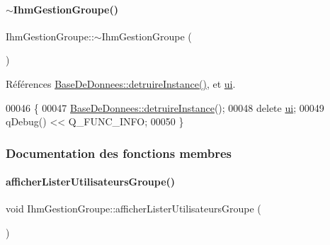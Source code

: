 \mbox{\label{class_ihm_gestion_groupe_aba32d8b8ea5b7d31232d41ae051ebcb7}} 
\paragraph{\texorpdfstring{$\sim$\+Ihm\+Gestion\+Groupe()}{~IhmGestionGroupe()}}
{\footnotesize\ttfamily Ihm\+Gestion\+Groupe\+::$\sim$\+Ihm\+Gestion\+Groupe (\begin{DoxyParamCaption}{ }\end{DoxyParamCaption})}



Références \hyperlink{class_base_de_donnees_a457401c0816b888c77ce915997545f4e}{Base\+De\+Donnees\+::detruire\+Instance()}, et \hyperlink{class_ihm_gestion_groupe_a9785ad3dadc1d2cad8558ca8b682dffd}{ui}.


\begin{DoxyCode}
00046 \{
00047     \hyperlink{class_base_de_donnees_a457401c0816b888c77ce915997545f4e}{BaseDeDonnees::detruireInstance}();
00048     \textcolor{keyword}{delete} \hyperlink{class_ihm_gestion_groupe_a9785ad3dadc1d2cad8558ca8b682dffd}{ui};
00049     qDebug() << Q\_FUNC\_INFO;
00050 \}
\end{DoxyCode}


\subsubsection{Documentation des fonctions membres}
\mbox{\label{class_ihm_gestion_groupe_a491098bb1e69aa1c09b76c3459da067f}} 
\paragraph{\texorpdfstring{afficher\+Lister\+Utilisateurs\+Groupe()}{afficherListerUtilisateursGroupe()}}
{\footnotesize\ttfamily void Ihm\+Gestion\+Groupe\+::afficher\+Lister\+Utilisateurs\+Groupe (\begin{DoxyParamCaption}{ }\end{DoxyParamCaption})\hspace{0.3cm}{\ttfamily [private]}}



